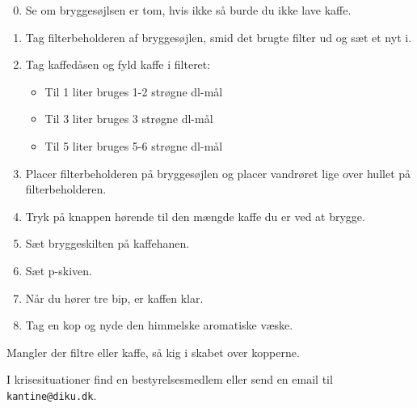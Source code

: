 \documentclass{article}
\begin{document}

\maketitle

\null

\fontsize{20}{22}\selectfont

\begin{enumerate}

\setcounter{enumi}{-1}

\itemsep0em

\item Se om bryggesøjlsen er tom, hvis ikke så burde du ikke lave kaffe.

\item Tag filterbeholderen af bryggesøjlen, smid det brugte filter ud og sæt et
nyt i.

\item Tag kaffedåsen og fyld kaffe i filteret:

\begin{itemize}

\bfseries

\item Til 1 liter bruges 1-2 strøgne dl-mål

\item Til 3 liter bruges 3 strøgne dl-mål

\item Til 5 liter bruges 5-6 strøgne dl-mål


\end{itemize} \normalfont

\item Placer filterbeholderen på bryggesøjlen og placer vandrøret lige over
hullet på filterbeholderen.

\item Tryk på knappen hørende til den mængde kaffe du er ved at brygge.

\item Sæt bryggeskilten på kaffehanen.

\item Sæt p-skiven.

\item Når du hører tre bip, er kaffen klar.

\item Tag en kop og nyde den himmelske aromatiske væske.

\end{enumerate}

\vspace{0.2cm}

\LARGE

\begin{center}

Mangler der filtre eller kaffe, så kig i skabet over kopperne.

I krisesituationer find en bestyrelsesmedlem eller send en email til
\texttt{kantine@diku.dk}.

\end{center}

\underskriv
\end{document}
